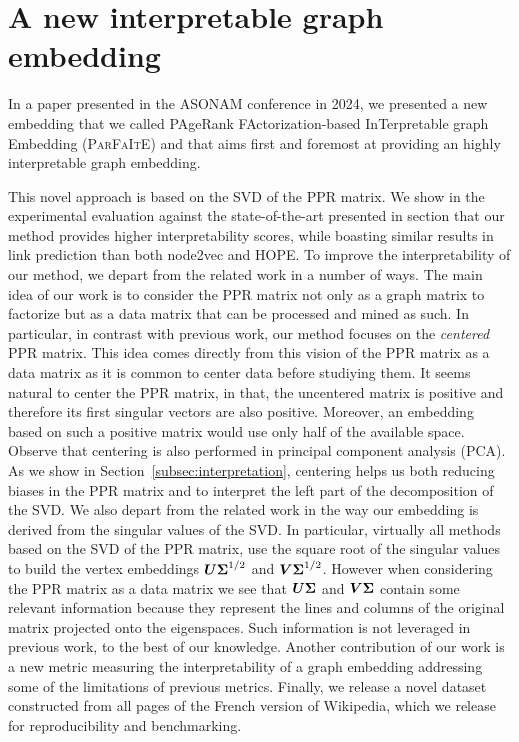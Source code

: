 \section{A new interpretable graph embedding}%

In a paper presented in the ASONAM conference in 2024, we presented a new embedding that we called PAgeRank FActorization-based InTerpretable graph Embedding (\textsc{ParFaItE}) and that aims first and foremost at providing an highly interpretable graph embedding.

This novel approach is based on the SVD of the PPR matrix. We show in the experimental evaluation against the state-of-the-art presented in section  that our method provides higher interpretability scores, while boasting similar results in link prediction than both node2vec and HOPE. To improve the interpretability of our method, we depart from the related work in a number of ways. The main idea of our work is to consider the PPR matrix not only as a graph matrix to factorize but as a data matrix that can be processed and mined as such. In particular, in contrast with previous work, our method focuses on the \textit{centered} PPR matrix. This idea comes directly from this vision of the PPR matrix as a data matrix as it is common to center data before studiying them. It seems natural to center the PPR matrix, in that, the uncentered matrix is positive and therefore its first singular vectors are also positive. Moreover, an embedding based on such a positive matrix would use only half of the available space. Observe that centering is also performed in principal component analysis (PCA). As we show in Section~\ref{subsec:interpretation}, centering helps us both reducing biases in the PPR matrix and to interpret the left part of the decomposition of the SVD. We also depart from the related work in the way our embedding is derived from the singular values of the SVD. In particular, virtually all methods based on the SVD of the PPR matrix, use the square root of the singular values to build the vertex embeddings $\boldsymbol{U}\boldsymbol{\Sigma}^{1/2}$ and $\boldsymbol{V}\boldsymbol{\Sigma}^{1/2}$. However when considering the PPR matrix as a data matrix we see that $\boldsymbol{U}\boldsymbol{\Sigma}$ and $\boldsymbol{V}\boldsymbol{\Sigma}$ contain some relevant information because they represent the lines and columns of the original matrix projected onto the eigenspaces. Such information is not leveraged in previous work, to the best of our knowledge.  Another contribution of our work is a new metric measuring the interpretability of a graph embedding addressing some of the limitations of previous metrics. Finally, we release a novel dataset constructed from all pages of the French version of Wikipedia, which we release for reproducibility and benchmarking.

